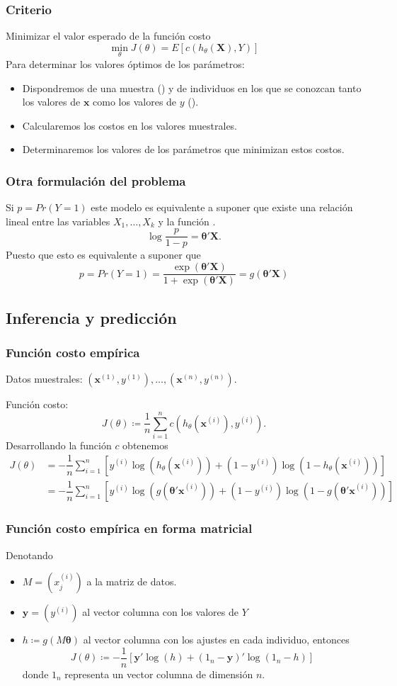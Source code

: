 \subsubsection{Criterio}
Minimizar el valor esperado de la función costo \[ \min_\theta J(\theta)=E[c(h_\theta(\mathbf{X}), Y)] \]
Para determinar los valores óptimos de los parámetros:
\begin{itemize}
	\item Dispondremos de una muestra () y de individuos en los que se conozcan tanto los valores de $\mathbf{x}$ como los valores de $y$ ().
	\item Calcularemos los costos en los valores muestrales.
	\item Determinaremos los valores de los parámetros que minimizan estos costos.
\end{itemize}
\subsubsection{Otra formulación del problema}
Si $p=Pr(Y=1)$ este modelo es equivalente a suponer que existe una relación lineal entre las variables $X_1,\dots,X_k$ y la función . \[ \log\dfrac{p}{1-p}=\mathbf{\theta'X}. \]
Puesto que esto es equivalente a suponer que \[ p=Pr(Y=1)=\dfrac{\exp(\mathbf{\theta'X})}{1+\exp(\mathbf{\theta'X})}=g(\mathbf{\theta'X}) \]
\subsection{Inferencia y predicción}
\subsubsection{Función costo empírica}
Datos muestrales: $(\mathbf{x}^{(1)},y^{(1)}),\dots,(\mathbf{x}^{(n)},y^{(n)})$.

Función costo: \[ J(\theta)\coloneq\dfrac{1}{n}\sum_{i=1}^{n}c(h_\theta(\mathbf{x}^{(i)}), y^{(i)}). \]
Desarrollando la función $c$ obtenemos \[ \begin{aligned}
	J(\theta)&=-\dfrac{1}{n}\sum_{i=1}^{n}\left[y^{(i)}\log(h_\theta(\mathbf{x}^{(i)}))+(1-y^{(i)})\log(1-h_\theta(\mathbf{x}^{(i)}))\right]\\
	&=-\dfrac{1}{n}\sum_{i=1}^{n}\left[y^{(i)}\log(g(\mathbf{\theta'x}^{(i)}))+(1-y^{(i)})\log(1-g(\mathbf{\theta'x}^{(i)}))\right]
\end{aligned} \]
\subsubsection{Función costo empírica en forma matricial}
Denotando
\begin{itemize}
	\item $M=(x_j^{(i)})$ a la matriz de datos.
	\item $\mathbf{y}=(y^{(i)})$ al vector columna con los valores de $Y$
	\item $h\coloneq g(M\mathbf{\theta})$ al vector columna con los ajustes en cada individuo, entonces \[ J(\theta)\coloneq-\dfrac{1}{n}\left[\mathbf{y}'\log(h)+(1_n-\mathbf{y})'\log(1_n-h)\right] \] donde $1_n$ representa un vector columna de dimensión $n$.
\end{itemize}
